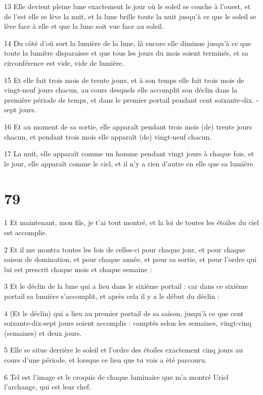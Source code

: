 \par 13 Elle devient pleine lune exactement le jour où le soleil se couche à l'ouest, et de l'est elle se lève la nuit, et la lune brille toute la nuit jusqu'à ce que le soleil se lève face à elle et que la lune soit vue face au soleil.
\par 14 Du côté d'où sort la lumière de la lune, là encore elle diminue jusqu'à ce que toute la lumière disparaisse et que tous les jours du mois soient terminés, et sa circonférence est vide, vide de lumière.
\par 15 Et elle fait trois mois de trente jours, et à son temps elle fait trois mois de vingt-neuf jours chacun, au cours desquels elle accomplit son déclin dans la première période de temps, et dans le premier portail pendant cent soixante-dix. -sept jours.
\par 16 Et au moment de sa sortie, elle apparaît pendant trois mois (de) trente jours chacun, et pendant trois mois elle apparaît (de) vingt-neuf chacun.
\par 17 La nuit, elle apparaît comme un homme pendant vingt jours à chaque fois, et le jour, elle apparaît comme le ciel, et il n'y a rien d'autre en elle que sa lumière.

\chapter{79}

\par 1 Et maintenant, mon fils, je t'ai tout montré, et la loi de toutes les étoiles du ciel est accomplie.
\par 2 Et il me montra toutes les lois de celles-ci pour chaque jour, et pour chaque saison de domination, et pour chaque année, et pour sa sortie, et pour l'ordre qui lui est prescrit chaque mois et chaque semaine :
\par 3 Et le déclin de la lune qui a lieu dans le sixième portail : car dans ce sixième portail sa lumière s'accomplit, et après cela il y a le début du déclin :
\par 4 (Et le déclin) qui a lieu au premier portail de sa saison, jusqu'à ce que cent soixante-dix-sept jours soient accomplis : comptés selon les semaines, vingt-cinq (semaines) et deux jours.
\par 5 Elle se situe derrière le soleil et l'ordre des étoiles exactement cinq jours au cours d'une période, et lorsque ce lieu que tu vois a été parcouru.
\par 6 Tel est l'image et le croquis de chaque luminaire que m'a montré Uriel l'archange, qui est leur chef.

